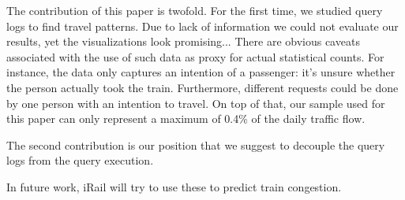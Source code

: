 \documentclass{sig-alternate}
\begin{document}
The contribution of this paper is twofold.
For the first time, we studied query logs to find travel patterns.
Due to lack of information we could not evaluate our results, yet the visualizations look promising...
There are obvious caveats associated with the use of such data as proxy for actual statistical counts. 
For instance, the data only captures an intention of a passenger: it's unsure whether the person actually took the train.
Furthermore, different requests could be done by one person with an intention to travel.
On top of that, our sample used for this paper can only represent a maximum of 0.4\% of the daily traffic flow.

The second contribution is our position that we suggest to decouple the query logs from the query execution.

In future work, iRail will try to use these to predict train congestion.
\let\oldsection\section
\renewcommand{\section}[2][1]{\oldsection{#1}\vspace{-3pt}}



\end{document}
